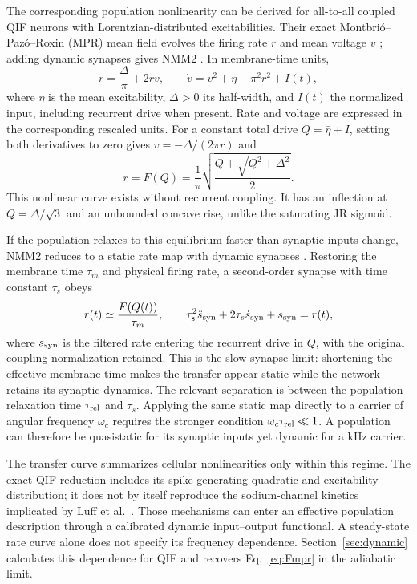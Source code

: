 \documentclass[11pt,a4paper]{article}
\begin{document}
The corresponding population nonlinearity can be derived for all-to-all coupled
QIF neurons with Lorentzian-distributed excitabilities. Their exact
Montbri\'o--Paz\'o--Roxin (MPR) mean field evolves the firing rate $r$ and mean voltage
$v$ \cite{montbrio2015}; adding dynamic synapses gives NMM2
\cite{ruffini2021nmm2,clusella2023}. In membrane-time units,
\begin{equation}
\dot r=\frac{\Delta}{\pi}+2rv,\qquad
\dot v=v^2+\bar\eta-\pi^2r^2+I(t),
\label{eq:mpr}
\end{equation}
where $\bar\eta$ is the mean excitability, $\Delta>0$ its half-width, and $I(t)$ the
normalized input, including recurrent drive when present. Rate and voltage are
expressed in the corresponding rescaled units. For a constant total drive
$Q=\bar\eta+I$, setting both derivatives to zero gives $v=-\Delta/(2\pi r)$ and
\begin{equation}
r=F(Q)=\frac{1}{\pi}\sqrt{\frac{Q+\sqrt{Q^2+\Delta^2}}{2}} .
\label{eq:Fmpr}
\end{equation}
This nonlinear curve exists without recurrent coupling. It has an inflection at
$Q=\Delta/\sqrt3$ and an unbounded concave rise, unlike the saturating JR sigmoid.

If the population relaxes to this equilibrium faster than synaptic inputs change,
NMM2 reduces to a static rate map with dynamic synapses
\cite{ruffini2021nmm2,clusella2023}. Restoring the membrane time $\tau_m$ and physical
firing rate, a second-order synapse with time constant $\tau_s$ obeys
\begin{equation}
r(t)\simeq \frac{F(Q(t))}{\tau_m},\qquad
\tau_s^2\ddot s_{\rm syn}+2\tau_s\dot s_{\rm syn}+s_{\rm syn}=r(t),
\label{eq:slow_synapse}
\end{equation}
where $s_{\rm syn}$ is the filtered rate entering the recurrent drive in $Q$, with the original
coupling normalization retained. This is the slow-synapse limit: shortening the
effective membrane time makes the transfer appear static while the network retains
its synaptic dynamics. The relevant separation is between the population relaxation
time $\tau_{\rm rel}$ and $\tau_s$. Applying the same static map directly to a
carrier of angular frequency $\omega_c$ requires the stronger condition
$\omega_c\tau_{\rm rel}\ll1$. A population can therefore be quasistatic for its
synaptic inputs yet dynamic for a kHz carrier.

The transfer curve summarizes cellular nonlinearities only within this regime.
The exact QIF reduction includes its spike-generating quadratic and excitability
distribution; it does not by itself reproduce the sodium-channel kinetics implicated
by Luff et al.\ \cite{luff2024mixer}. Those mechanisms can enter an effective
population description through a calibrated dynamic input--output functional.
A steady-state rate curve alone does not specify its frequency dependence.
Section~\ref{sec:dynamic} calculates this dependence for QIF and recovers
Eq.~\eqref{eq:Fmpr} in the adiabatic limit.
\end{document}
